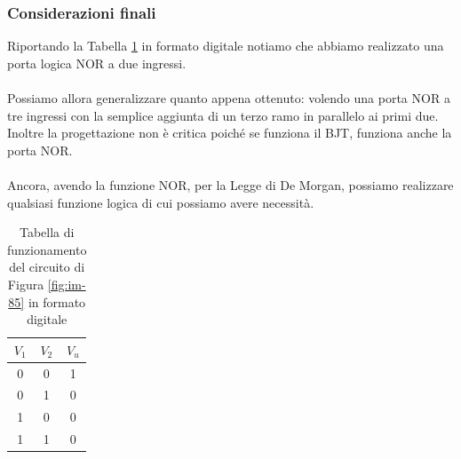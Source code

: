 \documentclass[../main.tex]{subfiles}
\begin{document}
	\subsubsection{Considerazioni finali}
	Riportando la Tabella \ref{tab:table-9} in formato digitale notiamo che abbiamo realizzato una porta logica NOR a due ingressi.\\\\
	Possiamo allora generalizzare quanto appena ottenuto: volendo una porta NOR a tre ingressi con la semplice aggiunta di un terzo ramo in parallelo ai primi due. \\
	Inoltre la progettazione non è critica poiché se funziona il BJT, funziona anche la porta NOR.\\\\
	Ancora, avendo la funzione NOR, per la Legge di De Morgan, possiamo realizzare qualsiasi funzione logica di cui possiamo avere necessità.
	\begin{table}[ht]
		\centering
		\begin{tabular}{|c|c|c|}
			\hline
			$V_1$ & $V_2$ & $V_u$ \\
			\hline
			0 & 0 & 1 \\
			\hline
			0 & 1 & 0 \\
			\hline
			1 & 0 & 0 \\
			\hline
			1 & 1 & 0 \\
			\hline
		\end{tabular}
		\caption{Tabella di funzionamento del circuito di Figura \ref{fig:im-85} in formato digitale}
		\label{tab:table-9}
	\end{table}
\end{document}
